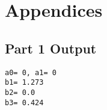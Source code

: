 \appendix
\section{Appendices}
\subsection{Part 1 Output}
\begin{scriptsize}
\begin{lstlisting}
a0= 0, a1= 0
b1= 1.273
b2= 0.0
b3= 0.424
\end{lstlisting}
\end{scriptsize}





